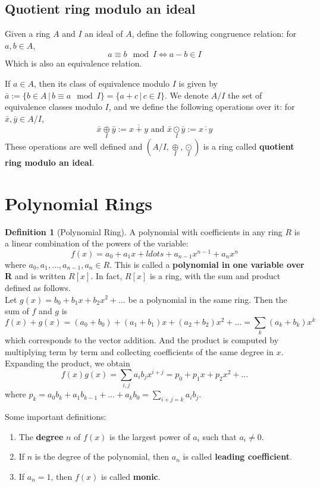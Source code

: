 \documentclass[12pt,a4paper]{article}
\theoremstyle{definition}
\newtheorem{definition}{Definition}[section]
\begin{document}
\subsection{Quotient ring modulo an ideal}

Given a ring $A$ and $I$ an ideal of $A$, define the following congruence relation: for $a, b \in A$,
\[a \equiv b \mod I \iff a- b \in I  \]
Which is also an equivalence relation.

If $a \in A$, then its class of equivalence modulo $I$ is given by \(\bar{a} := \{ b \in A \, | \, b \equiv a \mod I \} = \{ a + c \, | \, c \in I \}\). We denote $A/I$ the set of equivalence classes modulo $I$, and we define the following operations over it: for $\bar{x}, \bar{y} \in A/I$, 
\[
\bar{x} \underset{I}{\oplus} \bar{y} := \overline{x+y} \text{ and } \bar{x} \underset{I}{\odot} \bar{y} := \overline{x\cdot y}
\]
These operations are well defined and $(A/I, \underset{I}{\oplus},  \underset{I}{\odot})$ is a ring called \textbf{quotient ring modulo an ideal}.

\section{Polynomial Rings}\label{polynomial-rings}

\begin{definition}[Polynomial Ring]
A polynomial with coefficients in any ring $R$ is a linear combination of the powers of the variable:
\[
f(x) = a_0 + a_1 x + ldots + a_{n-1} x^{n-1} + a_n x^n
\]
where $a_0, a_1, \ldots, a_{n-1}, a_n \in R$. This is called a \textbf{polynomial in one variable over R} and is written $R[x]$. In fact, $R[x]$ is a ring, with the sum and product defined as follows. \\

Let $g(x) = b_0 + b_1 x + b_2 x^2 + \ldots$ be a polynomial in the same ring. Then the sum of $f$ and $g$ is 
\[
f(x) +  g(x) = (a_0 + b_0) + (a_1 + b_1)x + (a_2 + b_2)x^2 + \ldots = \sum_k (a_k + b_k)x^k
\]
which corresponds to the vector addition. And the product is computed by multiplying term by term and collecting coefficients of the same degree in $x$. Expanding the product, we obtain
\[
f(x)g(x) = \sum_{i,j} a_i b_j x^{i+j} = p_0 + p_1 x + p_2 x^2 + \ldots
\]
where $p_k = a_0 b_k + a_1 b_{k-1} + \ldots + a_k b_0 = \sum_{i+j=k} a_i b_j$.
\end{definition}

Some important definitions:
\begin{enumerate}
\item The \textbf{degree} $n$ of $f(x)$ is the largest power of $a_i$ such that $a_i \neq 0$.  
\item If $n$ is the degree of the polynomial, then $a_n$ is called \textbf{leading coefficient}. 
\item If $a_n = 1$, then $f(x)$ is called \textbf{monic}.
\end{enumerate}
\end{document}
